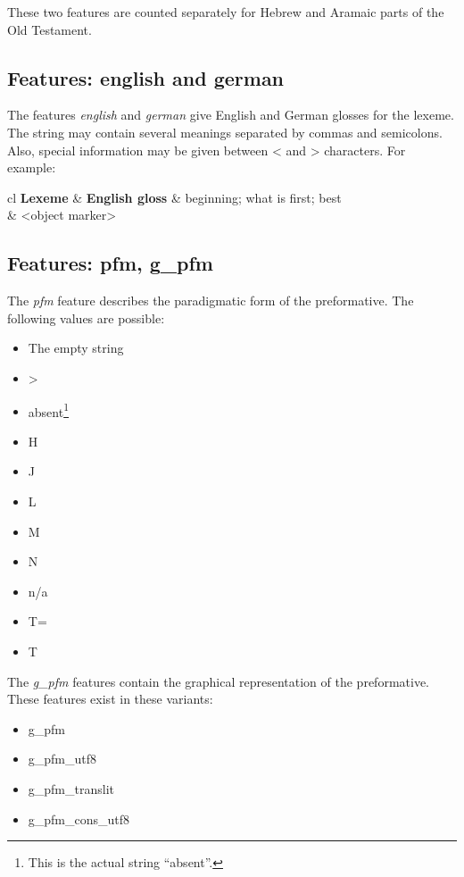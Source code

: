 \documentclass[11pt,oneside,a4paper]{memoir}
\makeatletter
\newcommand{\heb}[1]{{\RL {\ezr #1}}}
\newcommand{\headii}[2]{\textbf{#1} & \textbf{#2}}
\newenvironment{my-tabu}[2]{%
\begin{center}
\begin{tabu}{@{}#1@{}}
  \toprule
  #2\\\addlinespace[-1mm]
  \midrule
}{%
\addlinespace[-1mm]\bottomrule
\end{tabu}
\end{center}%
}
\makeatother
\begin{document}
These two features are counted separately for Hebrew and Aramaic parts of the Old Testament. 

\subsection{Features: english and german}

The features \emph{english} and \emph{german} give English and German glosses for the lexeme. The
string may contain several meanings separated by commas and semicolons. Also, special information
may be given between < and > characters. For example:

\begin{my-tabu}{cl}{ \headii{Lexeme}{English gloss} }
  \heb{רֵאשִׁית} & beginning; what is first; best\\
  \heb{אֵת} & <object marker>\\
\end{my-tabu}


\subsection{Features: pfm, g\_pfm}

The \emph{pfm} feature describes the paradigmatic form of the preformative. The following values are
possible:

\begin{itemize}
\item The empty string
\item >
\item absent\footnote{This is the actual string ``absent''.}
\item H
\item J
\item L
\item M
\item N
\item n/a
\item T=
\item T
\end{itemize}

The \emph{g\_pfm} features contain the graphical representation of the preformative. These
features exist in these variants:

\begin{itemize}
\item g\_pfm
\item g\_pfm\_utf8
\item g\_pfm\_translit
\item g\_pfm\_cons\_utf8
\end{itemize}
\end{document}
